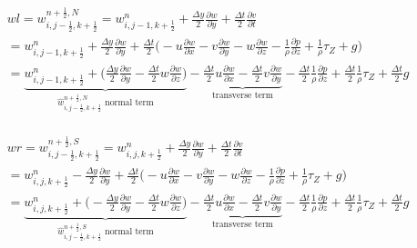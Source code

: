 \documentclass{article}
\numberwithin{equation}{subsection}
\begin{document}
\begin{align}
\begin{split}
& wl = w_{i,j-\frac{1}{2},k+\frac{1}{2}}^{n+\frac{1}{2},N} = w_{i,j-1,k+\frac{1}{2}}^n + \frac{\Delta y}{2}\frac{\partial w}{\partial y} + \frac{\Delta t}{2}\frac{\partial v}{\partial t} \\
&= w_{i,j-1,k+\frac{1}{2}}^n + \frac{\Delta y}{2} \frac{\partial w}{\partial y} + \frac{\Delta t}{2} \Big( -u\frac{\partial w}{\partial x} -v\frac{\partial w}{\partial y} -w\frac{\partial w}{\partial z} - \frac{1}{\rho}\frac{\partial p}{\partial z} +\frac{1}{\rho}\tau_Z + g\Big) \\
&= \underbrace{w_{i,j-1,k+\frac{1}{2}}^n + \Big(\frac{\Delta y}{2}\frac{\partial w}{\partial y} - \frac{\Delta t}{2} w\frac{\partial w}{\partial z}\Big)}_\text{$\widehat{w}_{i,j-\frac{1}{2},k+\frac{1}{2}}^{n+\frac{1}{2},N}$ normal term} -\underbrace{\frac{\Delta t}{2}u\frac{\partial w}{\partial x} - \frac{\Delta t}{2}v\frac{\partial w}{\partial y}}_\text{transverse term} - \frac{\Delta t}{2}\frac{1}{\rho}\frac{\partial p}{\partial z} + \frac{\Delta t}{2}\frac{1}{\rho}\tau_Z + \frac{\Delta t}{2}g
\end{split}
\end{align}

\begin{align}
\begin{split}
& wr = w_{i,j-\frac{1}{2},k+\frac{1}{2}}^{n+\frac{1}{2},S} = w_{i,j,k+\frac{1}{2}}^n + \frac{\Delta y}{2}\frac{\partial w}{\partial y} + \frac{\Delta t}{2}\frac{\partial v}{\partial t} \\
&= w_{i,j,k+\frac{1}{2}}^n - \frac{\Delta y}{2} \frac{\partial w}{\partial y} + \frac{\Delta t}{2} \Big( -u\frac{\partial w}{\partial x} -v\frac{\partial w}{\partial y} -w\frac{\partial w}{\partial z} - \frac{1}{\rho}\frac{\partial p}{\partial z} +\frac{1}{\rho}\tau_Z + g\Big) \\
&= \underbrace{w_{i,j,k+\frac{1}{2}}^n + \Big(-\frac{\Delta y}{2}\frac{\partial w}{\partial y} - \frac{\Delta t}{2} w\frac{\partial w}{\partial z}\Big)}_\text{$\widehat{w}_{i,j-\frac{1}{2},k+\frac{1}{2}}^{n+\frac{1}{2},S}$ normal term} -\underbrace{\frac{\Delta t}{2}u\frac{\partial w}{\partial x} - \frac{\Delta t}{2}v\frac{\partial w}{\partial y}}_\text{transverse term} - \frac{\Delta t}{2}\frac{1}{\rho}\frac{\partial p}{\partial z} + \frac{\Delta t}{2}\frac{1}{\rho}\tau_Z + \frac{\Delta t}{2}g
\end{split}
\end{align}
\end{document}
